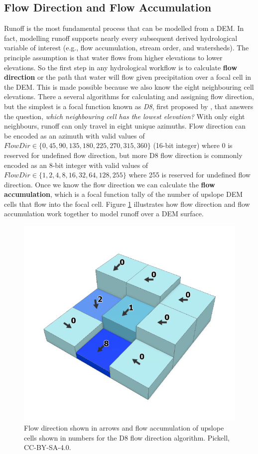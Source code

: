 \documentclass[
]{book}
\begin{document}
\hypertarget{flow-direction-and-flow-accumulation}{%
\subsection{Flow Direction and Flow Accumulation}\label{flow-direction-and-flow-accumulation}}

Runoff is the most fundamental process that can be modelled from a DEM. In fact, modelling runoff supports nearly every subsequent derived hydrological variable of interest (e.g., flow accumulation, stream order, and watersheds). The principle assumption is that water flows from higher elevations to lower elevations. So the first step in any hydrological workflow is to calculate \textbf{flow direction} or the path that water will flow given precipitation over a focal cell in the DEM. This is made possible because we also know the eight neighbouring cell elevations. There a several algorithms for calculating and assigning flow direction, but the simplest is a focal function known as \emph{D8}, first proposed by \citet{greenlee_raster_1987}, that answers the question, \emph{which neighbouring cell has the lowest elevation?} With only eight neighbours, runoff can only travel in eight unique azimuths. Flow direction can be encoded as an azimuth with valid values of \(FlowDir∈\{0,45,90,135,180,225,270,315,360\}\) (16-bit integer) where 0 is reserved for undefined flow direction, but more D8 flow direction is commonly encoded as an 8-bit integer with valid values of \(FlowDir∈\{1,2,4,8,16,32,64,128,255\}\) where 255 is reserved for undefined flow direction. Once we know the flow direction we can calculate the \textbf{flow accumulation}, which is a focal function tally of the number of upslope DEM cells that flow into the focal cell. Figure \ref{fig:9-flow-direction-accumulation} illustrates how flow direction and flow accumulation work together to model runoff over a DEM surface.

\begin{figure}
\includegraphics[width=0.75\linewidth]{images/09-flow-direction-accumulation} \caption{Flow direction shown in arrows and flow accumulation of upslope cells shown in numbers for the D8 flow direction algorithm. Pickell, CC-BY-SA-4.0.}\label{fig:9-flow-direction-accumulation}
\end{figure}
\end{document}
